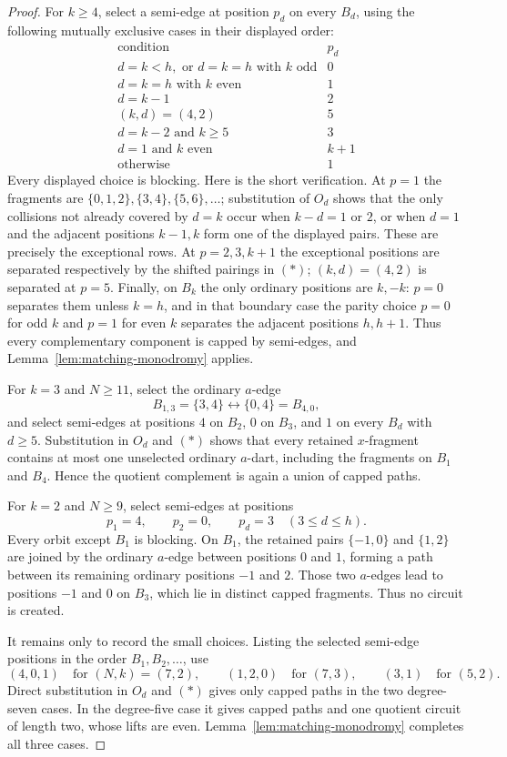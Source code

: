 \documentclass[11pt,a4paper]{article}
\theoremstyle{definition}
\theoremstyle{remark}
\begin{document}
\begin{proof}
For $k\ge4$, select a semi-edge at position $p_d$ on every $B_d$, using the following mutually exclusive cases in their displayed order:
\[
\begin{array}{c|c}
\text{condition}&p_d\\ \hline
d=k<h,\text{ or }d=k=h\text{ with }k\text{ odd}&0\\
d=k=h\text{ with }k\text{ even}&1\\
d=k-1&2\\
(k,d)=(4,2)&5\\
d=k-2\text{ and }k\ge5&3\\
d=1\text{ and }k\text{ even}&k+1\\
\text{otherwise}&1
\end{array}
\]
Every displayed choice is blocking.  Here is the short verification.  At $p=1$ the fragments are $\{0,1,2\},\{3,4\},\{5,6\},\ldots$; substitution of $O_d$ shows that the only collisions not already covered by $d=k$ occur when $k-d=1$ or $2$, or when $d=1$ and the adjacent positions $k-1,k$ form one of the displayed pairs.  These are precisely the exceptional rows.  At $p=2,3,k+1$ the exceptional positions are separated respectively by the shifted pairings in $(*)$; $(k,d)=(4,2)$ is separated at $p=5$.  Finally, on $B_k$ the only ordinary positions are $k,-k$: $p=0$ separates them unless $k=h$, and in that boundary case the parity choice $p=0$ for odd $k$ and $p=1$ for even $k$ separates the adjacent positions $h,h+1$.  Thus every complementary component is capped by semi-edges, and Lemma~\ref{lem:matching-monodromy} applies.

For $k=3$ and $N\ge11$, select the ordinary $a$-edge
\[
 B_{1,3}=\{3,4\}\longleftrightarrow \{0,4\}=B_{4,0},
\]
and select semi-edges at positions $4$ on $B_2$, $0$ on $B_3$, and $1$ on every $B_d$ with $d\ge5$.  Substitution in $O_d$ and $(*)$ shows that every retained $x$-fragment contains at most one unselected ordinary $a$-dart, including the fragments on $B_1$ and $B_4$.  Hence the quotient complement is again a union of capped paths.

For $k=2$ and $N\ge9$, select semi-edges at positions
\[
 p_1=4,\qquad p_2=0,\qquad p_d=3\quad(3\le d\le h).
\]
Every orbit except $B_1$ is blocking.  On $B_1$, the retained pairs $\{-1,0\}$ and $\{1,2\}$ are joined by the ordinary $a$-edge between positions $0$ and $1$, forming a path between its remaining ordinary positions $-1$ and $2$.  Those two $a$-edges lead to positions $-1$ and $0$ on $B_3$, which lie in distinct capped fragments.  Thus no circuit is created.

It remains only to record the small choices.  Listing the selected semi-edge positions in the order $B_1,B_2,\ldots$, use
\[
 (4,0,1)\quad\text{for }(N,k)=(7,2),\qquad
 (1,2,0)\quad\text{for }(7,3),\qquad
 (3,1)\quad\text{for }(5,2).
\]
Direct substitution in $O_d$ and $(*)$ gives only capped paths in the two degree-seven cases.  In the degree-five case it gives capped paths and one quotient circuit of length two, whose lifts are even.  Lemma~\ref{lem:matching-monodromy} completes all three cases.
\end{proof}
\end{document}
